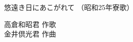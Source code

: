 \documentclass[10pt,b5j]{tarticle} %
\begin{document}
\begin{minipage}[c]{0.7\hsize} %
    \begin{center}
        {\LARGE
            悠遠き日にあこがれて %
        }
        {\small 
            （昭和25年寮歌） %
        }
    \end{center}
\end{minipage}
\begin{minipage}[c]{0.3\hsize} %
    \begin{flushright} %
        高倉和昭君 作歌\\金井倶光君 作曲 %
    \end{flushright}
\end{minipage}
\end{document}
